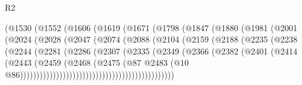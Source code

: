 \begin{lexlean}{R2}
\begin{coremodule}
                          (@1530
                            (@1552
                              (@1606
                                (@1619
                                  (@1671
                                    (@1798
                                      (@1847
                                        (@1880
                                          (@1981
                                            (@2001
                                              (@2024
                                                (@2028
                                                  (@2047
                                                    (@2074
                                                      (@2088
                                                        (@2104
                                                          (@2159
                                                            (@2188
                                                              (@2235
                                                                (@2238
                                                                  (@2244
                                                                    (@2281
                                                                      (@2286
                                                                        (@2307
                                                                          (@2335
                                                                            (@2349
                                                                              (@2366
                                                                                (@2382
                                                                                  (@2401
                                                                                    (@2414
                                                                                      (@2443
                                                                                        (@2459
                                                                                          (@2468
                                                                                            (@2475
                                                                                              (@87
                                                                                                @2483
                                                                                                (@10
                                                                                                  @86)))))))))))))))))))))))))))))))))))))))))))))))

\end{coremodule}
\end{lexlean}
